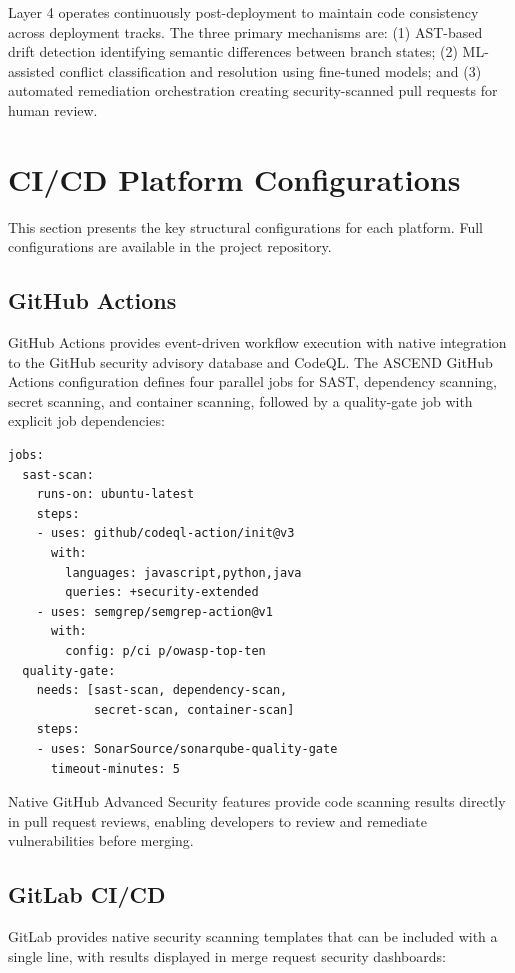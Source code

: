 \documentclass[journal]{IEEEtran}
\begin{document}
Layer 4 operates continuously post-deployment to maintain code consistency across deployment tracks. The three primary mechanisms are: (1) AST-based drift detection identifying semantic differences between branch states; (2) ML-assisted conflict classification and resolution using fine-tuned models; and (3) automated remediation orchestration creating security-scanned pull requests for human review.

\section{CI/CD Platform Configurations}
\label{sec:platform}

This section presents the key structural configurations for each platform. Full configurations are available in the project repository.

\subsection{GitHub Actions}

GitHub Actions provides event-driven workflow execution with native integration to the GitHub security advisory database and CodeQL. The ASCEND GitHub Actions configuration defines four parallel jobs for SAST, dependency scanning, secret scanning, and container scanning, followed by a quality-gate job with explicit job dependencies:

{\scriptsize
\begin{verbatim}
jobs:
  sast-scan:
    runs-on: ubuntu-latest
    steps:
    - uses: github/codeql-action/init@v3
      with:
        languages: javascript,python,java
        queries: +security-extended
    - uses: semgrep/semgrep-action@v1
      with:
        config: p/ci p/owasp-top-ten
  quality-gate:
    needs: [sast-scan, dependency-scan,
            secret-scan, container-scan]
    steps:
    - uses: SonarSource/sonarqube-quality-gate
      timeout-minutes: 5
\end{verbatim}
}

Native GitHub Advanced Security features provide code scanning results directly in pull request reviews, enabling developers to review and remediate vulnerabilities before merging.

\subsection{GitLab CI/CD}

GitLab provides native security scanning templates that can be included with a single line, with results displayed in merge request security dashboards:
\end{document}
